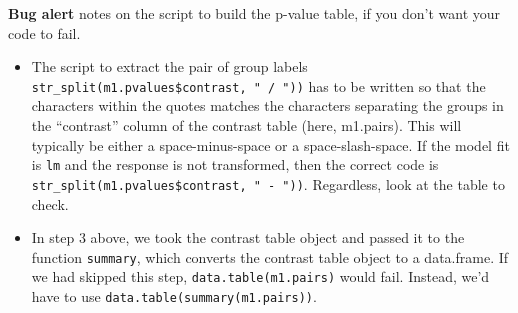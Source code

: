 \documentclass[]{book}
\newenvironment{Shaded}{\begin{snugshade}}{\end{snugshade}}
\newcommand{\CommentTok}[1]{\textcolor[rgb]{0.56,0.35,0.01}{\textit{#1}}}
\newcommand{\DecValTok}[1]{\textcolor[rgb]{0.00,0.00,0.81}{#1}}
\newcommand{\ErrorTok}[1]{\textcolor[rgb]{0.64,0.00,0.00}{\textbf{#1}}}
\newcommand{\KeywordTok}[1]{\textcolor[rgb]{0.13,0.29,0.53}{\textbf{#1}}}
\newcommand{\NormalTok}[1]{#1}
\newcommand{\OperatorTok}[1]{\textcolor[rgb]{0.81,0.36,0.00}{\textbf{#1}}}
\newcommand{\StringTok}[1]{\textcolor[rgb]{0.31,0.60,0.02}{#1}}
\providecommand{\tightlist}{%
  \setlength{\itemsep}{0pt}\setlength{\parskip}{0pt}}
\begin{document}
\begin{Shaded}
\end{Shaded}

\textbf{Bug alert} notes on the script to build the p-value table, if you don't want your code to fail.

\begin{itemize}
\tightlist
\item
  The script to extract the pair of group labels \texttt{str\_split(m1.pvalues\$contrast,\ "\ /\ "))} has to be written so that the characters within the quotes matches the characters separating the groups in the ``contrast'' column of the contrast table (here, m1.pairs). This will typically be either a space-minus-space or a space-slash-space. If the model fit is \texttt{lm} and the response is not transformed, then the correct code is \texttt{str\_split(m1.pvalues\$contrast,\ "\ -\ "))}. Regardless, look at the table to check.
\item
  In step 3 above, we took the contrast table object and passed it to the function \texttt{summary}, which converts the contrast table object to a data.frame. If we had skipped this step, \texttt{data.table(m1.pairs)} would fail. Instead, we'd have to use \texttt{data.table(summary(m1.pairs))}.
\end{itemize}
\end{document}
